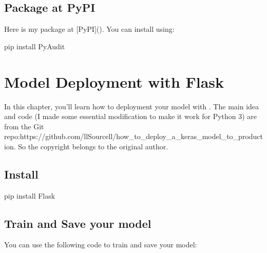 \documentclass[letterpaper,12pt,english]{sphinxmanual}
\begin{document}
\section{Package at PyPI}
\label{\detokenize{pypi:package-at-pypi}}
Here is my  package at {[}PyPI{]}(). You can install  using:

%
\begin{sphinxVerbatim}[commandchars=\\\{\}]
pip install PyAudit
\end{sphinxVerbatim}


\chapter{Model Deployment with Flask}
\label{\detokenize{deploy:model-deployment-with-flask}}\label{\detokenize{deploy:deploy}}\label{\detokenize{deploy::doc}}
In this chapter, you’ll learn how to deployment your model with . The main idea and code (I made some essential modification to make it work for Python 3) are from the Git repo:https://github.com/llSourcell/how\_to\_deploy\_a\_keras\_model\_to\_production. So the copyright belongs to the original author.


\section{Install }
\label{\detokenize{deploy:install-flask}}
%
\begin{sphinxVerbatim}[commandchars=\\\{\}]
pip install Flask
\end{sphinxVerbatim}


\section{Train and Save your model}
\label{\detokenize{deploy:train-and-save-your-model}}
You can use the following code to train and save your  model:
\end{document}

